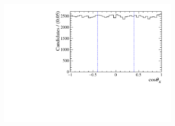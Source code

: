 \begin{figure}[!ht]
\begin{subfigure}[t]{0.32\textwidth}
        \centering 
        \includegraphics[width=1.0\textwidth]{figs/B2DsPhi/f0_1370_Helicity.pdf}
    \end{subfigure}\\


\end{figure}
